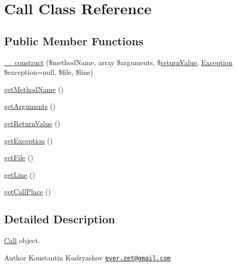 \hypertarget{class_prophecy_1_1_call_1_1_call}{}\section{Call Class Reference}
\label{class_prophecy_1_1_call_1_1_call}
\subsection*{Public Member Functions}
\begin{DoxyCompactItemize}
\item 
\mbox{\hyperlink{class_prophecy_1_1_call_1_1_call_a39dcd5072e9bf148a19e4071575bf9db}{\+\_\+\+\_\+construct}} (\$method\+Name, array \$arguments, \$\mbox{\hyperlink{_functions_8php_abde2df1d4e6445dc0068e921223f2b48}{return\+Value}}, \mbox{\hyperlink{interface_prophecy_1_1_exception_1_1_exception}{Exception}} \$exception=null, \$file, \$line)
\item 
\mbox{\hyperlink{class_prophecy_1_1_call_1_1_call_a0fa2079426d0262e759c4105fa4e9163}{get\+Method\+Name}} ()
\item 
\mbox{\hyperlink{class_prophecy_1_1_call_1_1_call_a1d4c324c5a088be98d99d3efbf3502e1}{get\+Arguments}} ()
\item 
\mbox{\hyperlink{class_prophecy_1_1_call_1_1_call_a9e5edfa18e5d1bf915d15d6a6bf492c4}{get\+Return\+Value}} ()
\item 
\mbox{\hyperlink{class_prophecy_1_1_call_1_1_call_a31ec439e56ccf74108b96587373a112c}{get\+Exception}} ()
\item 
\mbox{\hyperlink{class_prophecy_1_1_call_1_1_call_adf61e733be7f62a3f4bedbe7d2e02ec2}{get\+File}} ()
\item 
\mbox{\hyperlink{class_prophecy_1_1_call_1_1_call_aef9c32f6066788a101028a1d4150f8cb}{get\+Line}} ()
\item 
\mbox{\hyperlink{class_prophecy_1_1_call_1_1_call_a969d1eb362c15f660c2f0f75ed3d265b}{get\+Call\+Place}} ()
\end{DoxyCompactItemize}


\subsection{Detailed Description}
\mbox{\hyperlink{class_prophecy_1_1_call_1_1_call}{Call}} object.

\begin{DoxyAuthor}{Author}
Konstantin Kudryashov \href{mailto:ever.zet@gmail.com}{\tt ever.\+zet@gmail.\+com} 
\end{DoxyAuthor}


